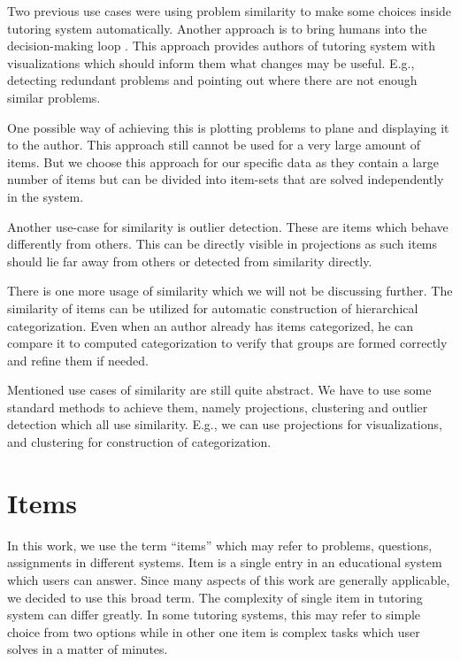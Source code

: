 \documentclass[
  digital, %
  table,   %
  nolof,     %
  nolot,     %
  nocover,
  color,
  final, %
]{fithesis3}
\begin{document}
Two previous use cases were using problem similarity to make some choices inside tutoring system automatically. Another approach is to bring humans into the decision-making loop \cite{baker2016stupid}. This approach provides authors of tutoring system with visualizations which should inform them what changes may be useful. E.g., detecting redundant problems and pointing out where there are not enough similar problems.

One possible way of achieving this is plotting problems to plane and displaying it to the author. This approach still cannot be used for a very large amount of items. But we choose this approach for our specific data as they contain a large number of items but can be divided into item-sets that are solved independently in the system.

Another use-case for similarity is outlier detection. These are items which behave differently from others. This can be directly visible in projections as such items should lie far away from others or detected from similarity directly.

There is one more usage of similarity which we will not be discussing further. The similarity of items can be utilized for automatic construction of hierarchical categorization. Even when an author already has items categorized, he can compare it to computed categorization to verify that groups are formed correctly and refine them if needed.


Mentioned use cases of similarity are still quite abstract. We have to use some standard methods to achieve them, namely projections, clustering and outlier detection which all use similarity. E.g., we can use projections for visualizations, and clustering for construction of categorization.


\section{Items}\label{items}


In this work, we use the term ``items'' which may refer to problems, questions, assignments in different systems. Item is a single entry in an educational system which users can answer. Since many aspects of this work are generally applicable, we decided to use this broad term. The complexity of single item in tutoring system can differ greatly. In some tutoring systems, this may refer to simple choice from two options while in other one item is complex tasks which user solves in a matter of minutes.
\end{document}
